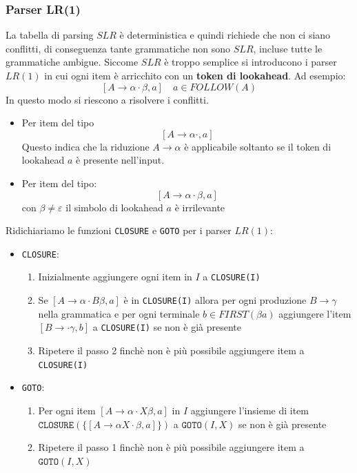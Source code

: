 \documentclass[a4paper]{article}
\begin{document}
\subsubsection{Parser LR(1)}
La tabella di parsing \( SLR \) è deterministica e quindi richiede che non ci siano
conflitti, di conseguenza tante grammatiche non sono \( SLR \), incluse tutte le
grammatiche ambigue. Siccome \( SLR \) è troppo semplice si introducono i parser
\( LR(1) \) in cui ogni item è arricchito con un \textbf{token di lookahead}.
Ad esempio:
\[
  [ A \to \alpha \cdot \beta, a ] \quad a \in FOLLOW(A)
\] 
In questo modo si riescono a risolvere i conflitti.
\begin{itemize}
  \item Per item del tipo
    \[
      [ A \to \alpha \cdot, a ]
    \] 
    Questo indica che la riduzione \( A \to \alpha \) è applicabile soltanto se il
    token di lookahead \( a \) è presente nell'input. 

  \item Per item del tipo:
    \[
      [ A \to \alpha \cdot \beta, a ]
    \] 
    con \( \beta \neq \varepsilon  \) il simbolo di lookahead \( a \) è irrilevante
\end{itemize}
Ridichiariamo le funzioni \texttt{CLOSURE} e \texttt{GOTO} per i parser \( LR(1) \):
\begin{itemize}
  \item \texttt{CLOSURE}:
    \begin{enumerate}
      \item Inizialmente aggiungere ogni item in \( I \) a \texttt{CLOSURE(I)}
      \item Se \( [ A \to \alpha \cdot B \beta, a ] \) è in \texttt{CLOSURE(I)} allora per
        ogni produzione \( B \to \gamma \) nella grammatica e per ogni terminale \( b \in FIRST(\beta a) \)
        aggiungere l'item \( [ B \to \cdot \gamma, b ] \) a \texttt{CLOSURE(I)} se non è
        già presente
      \item Ripetere il passo 2 finchè non è più possibile aggiungere item a \texttt{CLOSURE(I)}
    \end{enumerate}

  \item \texttt{GOTO}:
    \begin{enumerate}
      \item Per ogni item \([  A \to \alpha \cdot X \beta, a  ]\) in \( I \) aggiungere
        l'insieme di item \( \texttt{CLOSURE}(\{ [ A \to \alpha X \cdot \beta, a ] \}) \) a
        \( \texttt{GOTO}(I, X) \) se non è già presente

      \item Ripetere il passo 1 finchè non è più possibile aggiungere item a
        \( \texttt{GOTO}(I, X) \)
    \end{enumerate}
\end{itemize}
\end{document}
